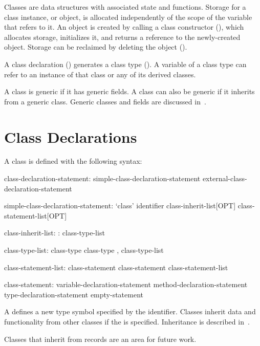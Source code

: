 \label{Classes}

Classes are data structures with associated state and functions. Storage for
a class instance, or object, is allocated independently of the scope of
the variable that refers to it.
An object is created by calling a class constructor
(), which allocates storage, initializes it,
and returns a reference to the newly-created object.
Storage can be reclaimed by deleting the object ().

A class declaration () generates a class
type ().  A variable of a class type can refer to an
instance of that class or any of its derived classes.

A class is generic if it has generic fields. A class can also
be generic if it inherits from a generic class. Generic classes and fields
are discussed in~.

\section{Class Declarations}
\label{Class_Declarations}

A class is defined with the following syntax:
\begin{syntax}
class-declaration-statement:
  simple-class-declaration-statement
  external-class-declaration-statement

simple-class-declaration-statement:
  `class' identifier class-inherit-list[OPT] { class-statement-list[OPT] }

class-inherit-list:
  : class-type-list

class-type-list:
  class-type
  class-type , class-type-list

class-statement-list:
  class-statement
  class-statement class-statement-list

class-statement:
  variable-declaration-statement
  method-declaration-statement
  type-declaration-statement
  empty-statement
\end{syntax}

A  defines a new type symbol
specified by the identifier.  Classes inherit data and functionality
from other classes %
if the  is specified.
Inheritance is described in~.

\begin{openissue}
Classes that inherit from records are an area for future work.
\end{openissue}

